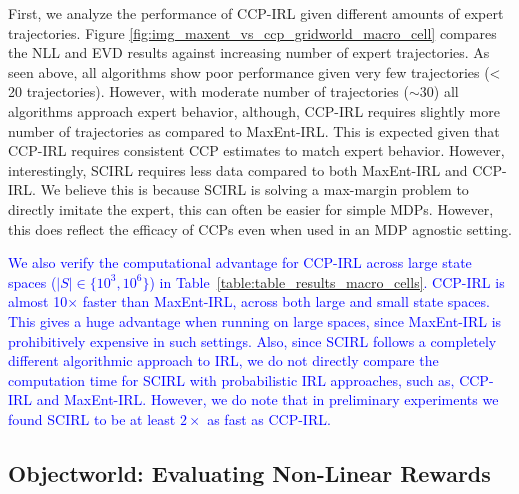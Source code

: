 \documentclass{article}
\begin{document}
First, we analyze the performance of CCP-IRL given different amounts of expert trajectories.
Figure \ref{fig:img_maxent_vs_ccp_gridworld_macro_cell} compares the NLL and EVD results against increasing number of expert trajectories.
As seen above, all algorithms show poor performance given very few trajectories (< 20 trajectories).
However, with moderate number of trajectories ($\sim$30) all algorithms approach expert behavior, although, CCP-IRL requires slightly more number of trajectories as compared to MaxEnt-IRL. This is expected given that CCP-IRL requires consistent CCP estimates to match expert behavior. However, interestingly, SCIRL requires less data compared to both MaxEnt-IRL and CCP-IRL. We believe this is because SCIRL is solving a max-margin problem to directly imitate the expert, this can often be easier for simple MDPs. However, this does reflect the efficacy of CCPs even when used in an MDP agnostic setting.

\textcolor{blue}{
We also verify the computational advantage for CCP-IRL across large state spaces ($|S| \in \{10^3, 10^6\}$) in Table~\ref{table:table_results_macro_cells}. CCP-IRL is almost 10$\times$ faster than MaxEnt-IRL, across both large and small state spaces. This gives a huge advantage when running on large spaces, since MaxEnt-IRL is prohibitively expensive in such settings. Also, since SCIRL follows a completely different algorithmic approach to IRL, we do not directly compare the computation time for SCIRL with probabilistic IRL approaches, such as, CCP-IRL and MaxEnt-IRL. However, we do note that in preliminary experiments we found SCIRL to be at least $2\times$ as fast as CCP-IRL.
}

\subsection{Objectworld: Evaluating Non-Linear Rewards}
\end{document}
